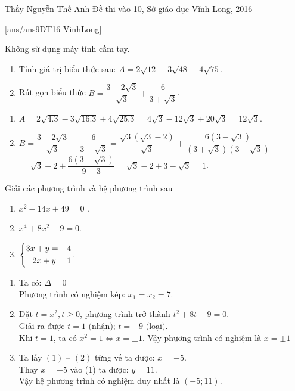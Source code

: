 \begin{name}
{Thầy  Nguyễn Thế Anh}
{Đề thi vào 10, Sở giáo dục Vĩnh Long, 2016}
\end{name}
\setcounter{ex}{0}
[ans/ans9DT16-VinhLong]
\begin{ex}%
    Không sử dụng máy tính cầm tay.
    \begin{enumerate}
            \item Tính giá trị biểu thức sau: $A=2\sqrt{12}-3\sqrt{48}+4\sqrt{75}$.
        \item Rút gọn biểu thức $B=\dfrac{3-2\sqrt{3}}{\sqrt{3}}+\dfrac{6}{3+\sqrt{3}}$.
    \end{enumerate}
\loigiai
    {
    \begin{enumerate}
        \item $A=2\sqrt{4.3}-3\sqrt{16.3}+4\sqrt{25.3}=4\sqrt{3}-12\sqrt{3}+20\sqrt{3}=12\sqrt{3}$.
        \item $B=\dfrac{3-2\sqrt{3}}{\sqrt{3}}+\dfrac{6}{3+\sqrt{3}}=\dfrac{\sqrt{3}\left( \sqrt{3}-2 \right)}{\sqrt{3}}+\dfrac{6\left( 3-\sqrt{3} \right)}{\left( 3+\sqrt{3} \right)\left( 3-\sqrt{3} \right)}$\\
            $=\sqrt{3}-2+\dfrac{6\left( 3-\sqrt{3} \right)}{9-3}=\sqrt{3}-2+3-\sqrt{3}=1$.
    \end{enumerate}
    }
\end{ex}
\begin{ex}%
Giải các phương trình và hệ phương trình sau
    \begin{enumerate}
        \item $x^2-14x+49=0$ .
        \item $x^4+8x^2-9=0$.
        \item $\left\{\begin{aligned}3x+y=-4 \\2x+y=1\end{aligned}\right.$.
    \end{enumerate}
\loigiai
    {
    \begin{enumerate}
        \item Ta có: $\Delta =0$\\	
        Phương trình có nghiệm kép: $x_1=x_2=7$.
        \item Đặt $t=x^2, t\ge 0$, phương trình trở thành $t^2+8t-9=0$.\\
            Giải ra được $t=1\text{ (nhận)}$; $t=-9\text{ (loại)}$.\\
            Khi $t=1$, ta có $x^2=1\Leftrightarrow x=\pm 1$.
            Vậy phương trình có nghiệm là $x=\pm 1$
        \item Ta lấy $(1)$ – $(2)$ từng vế ta được: $x=-5$.\\
            Thay $x=-5$ vào (1) ta được: $y=11$.\\
        Vậy hệ phương trình có nghiệm duy nhất là $(-5;11)$.
    \end{enumerate}
        }
\end{ex}

